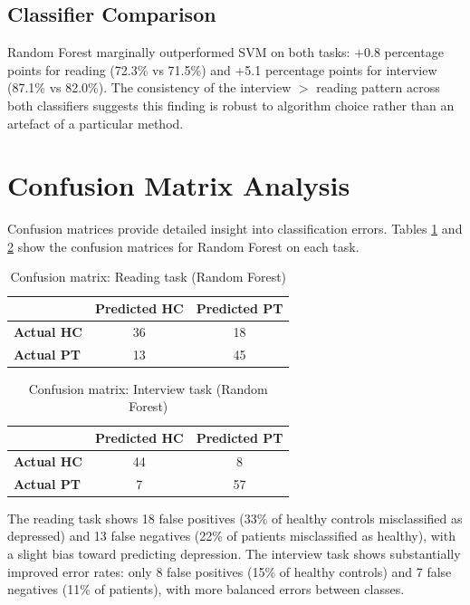 \subsection{Classifier Comparison}

Random Forest marginally outperformed SVM on both tasks: +0.8 percentage points for reading (72.3\% vs 71.5\%) and +5.1 percentage points for interview (87.1\% vs 82.0\%). The consistency of the interview $>$ reading pattern across both classifiers suggests this finding is robust to algorithm choice rather than an artefact of a particular method.

\section{Confusion Matrix Analysis}

Confusion matrices provide detailed insight into classification errors. Tables \ref{tab:cm-reading} and \ref{tab:cm-interview} show the confusion matrices for Random Forest on each task.

\begin{table}[h]
\centering
\caption{Confusion matrix: Reading task (Random Forest)}
\label{tab:cm-reading}
\begin{tabular}{lcc}
\hline
 & \textbf{Predicted HC} & \textbf{Predicted PT} \\
\hline
\textbf{Actual HC} & 36 & 18 \\
\textbf{Actual PT} & 13 & 45 \\
\hline
\end{tabular}
\end{table}

\begin{table}[h]
\centering
\caption{Confusion matrix: Interview task (Random Forest)}
\label{tab:cm-interview}
\begin{tabular}{lcc}
\hline
 & \textbf{Predicted HC} & \textbf{Predicted PT} \\
\hline
\textbf{Actual HC} & 44 & 8 \\
\textbf{Actual PT} & 7 & 57 \\
\hline
\end{tabular}
\end{table}

The reading task shows 18 false positives (33\% of healthy controls misclassified as depressed) and 13 false negatives (22\% of patients misclassified as healthy), with a slight bias toward predicting depression. The interview task shows substantially improved error rates: only 8 false positives (15\% of healthy controls) and 7 false negatives (11\% of patients), with more balanced errors between classes.

